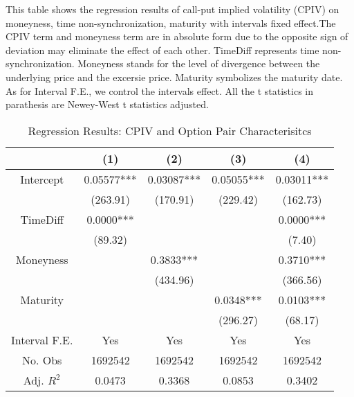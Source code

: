 
\begin{table}[h]
\centering
\caption{Regression Results: CPIV and Option Pair Characterisitcs}\label{table:regression1}
\begin{threeparttable}

\medskip

{\scriptsize 
This table shows the regression results of call-put implied volatility (CPIV) on moneyness, time non-synchronization, maturity with intervals fixed effect.The CPIV term and moneyness term are in absolute form due to the opposite sign of deviation may eliminate the effect of each other. TimeDiff represents time non-synchronization. Moneyness stands for the level of divergence between the underlying price and the excersie price. Maturity symbolizes the maturity date. As
for Interval F.E., we control the intervals effect. All the t statistics in parathesis are Newey-West t statistics adjusted.
}
\medskip
\small
\centering
\begin{tabular}{ccccc}
\toprule
              & (1)        & (2)        & (3)        & (4)        \\ \midrule
Intercept     & 0.05577*** & 0.03087*** & 0.05055*** & 0.03011*** \\
              & (263.91)   & (170.91)   & (229.42)   & (162.73)   \\
TimeDiff      & 0.0000***  &            &            & 0.0000***  \\
              & (89.32)    &            &            & (7.40)     \\
Moneyness     &            & 0.3833***  &            & 0.3710***  \\
              &            & (434.96)   &            & (366.56)   \\
Maturity      &            &            & 0.0348***  & 0.0103***  \\
              &            &            & (296.27)   & (68.17)    \\
Interval F.E. & Yes        & Yes        & Yes        & Yes        \\
No. Obs       & 1692542    & 1692542    & 1692542    & 1692542    \\
Adj. $R^{2}$  & 0.0473     & 0.3368     & 0.0853     & 0.3402     \\
\bottomrule
\end{tabular}


\end{threeparttable}
\end{table}
